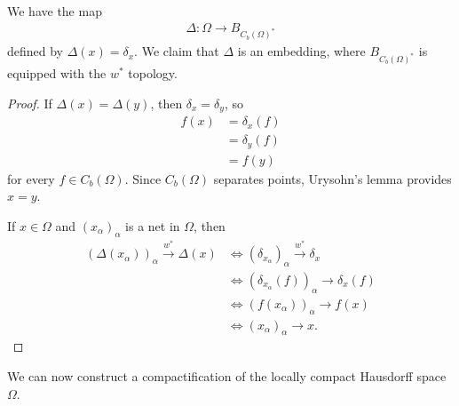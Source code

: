 \documentclass[10pt]{mypackage}
\begin{document}
We have the map
\begin{align*}
  \Delta: \Omega\rightarrow B_{C_b\left(\Omega\right)^{\ast}}
\end{align*}
defined by $\Delta(x) = \delta_{x}$. We claim that $\Delta$ is an embedding, where $B_{C_b\left(\Omega\right)^{\ast}}$ is equipped with the $w^{\ast}$ topology.
\begin{proof}
  If $\Delta\left(x\right) = \Delta\left(y\right)$, then $\delta_{x} = \delta_{y}$, so 
  \begin{align*}
    f(x) &= \delta_{x}\left(f\right)\\
         &= \delta_{y}\left(f\right)\\
         &= f(y)
  \end{align*}
  for every $f\in C_b\left(\Omega\right)$. Since $C_b\left(\Omega\right)$ separates points, Urysohn's lemma provides $x = y$.\newline

  If $x\in \Omega$ and $\left(x_{\alpha}\right)_{\alpha}$ is a net in $\Omega$, then
  \begin{align*}
    \left(\Delta\left(x_{\alpha}\right)\right)_{\alpha}\xrightarrow{w^{\ast}}\Delta\left(x\right) &\Leftrightarrow \left(\delta_{x_{\alpha}}\right)_{\alpha}\xrightarrow{w^{\ast}}\delta_{x}\\
                                                                                                  &\Leftrightarrow \left(\delta_{x_{\alpha}}\left(f\right)\right)_{\alpha}\rightarrow \delta_{x}\left(f\right)\\
                                                                                                  &\Leftrightarrow \left(f\left(x_{\alpha}\right)\right)_{\alpha}\rightarrow f(x)\\
                                                                                                  &\Leftrightarrow \left(x_{\alpha}\right)_{\alpha}\rightarrow x.
  \end{align*}
\end{proof}
We can now construct a compactification of the locally compact Hausdorff space $\Omega$.
\end{document}

